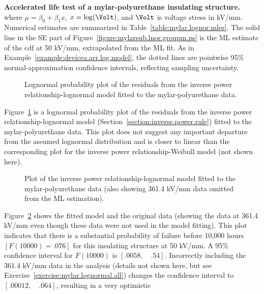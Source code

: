 \begin{example}{\bf Accelerated life test of a mylar-polyurethane insulating 
structure.}
\begin{displaymath}
\end{displaymath}
where $\mu = \beta_{0}+ \beta_{1} x$, $x=\log(\text{\Volt})$, and
$\Volt$ is voltage stress in kV/mm. Numerical estimates are
summarized in Table~\ref{table:mylar.lognor.mles}.  The solid line
in the SE part of Figure~\ref{figure:mylarsub.lnor.groupm.ps} is the
ML estimate of the cdf at 50 kV/mm, extrapolated from the ML fit. As
in Example~\ref{example:devicea.arr.log.model}, the dotted lines are
pointwise 95\% normal-approximation confidence intervals, reflecting
sampling uncertainty.
\begin{figure}
\caption{Lognormal
probability plot of the residuals from the inverse power
relationship-lognormal model fitted to the mylar-polyurethane data.}
\label{figure:mylarsub.residual.linear.lnor.ps}
\end{figure}
Figure~\ref{figure:mylarsub.residual.linear.lnor.ps} is a lognormal
probability plot of the residuals from the inverse power
relationship-lognormal model (Section~\ref{section:inverse.power.rule})
fitted to the mylar-polyurethane data. This plot does not
suggest any important departure from the assumed lognormal
distribution and is closer to linear than the corresponding plot for
the inverse power relationship-Weibull model (not shown here).
\begin{figure}
\caption{Plot of the inverse power relationship-lognormal model fitted to the
mylar-polyurethane data (also showing 361.4 kV/mm
data omitted from the ML estimation).}
\label{figure:mylarpoly.lnor.altplot.ps}
\end{figure}
Figure~\ref{figure:mylarpoly.lnor.altplot.ps} shows the fitted model
and the original data (showing the data at 361.4 kV/mm even though
these data were not used in the model fitting). This plot indicates
that there is a substantial probability of failure before 10,000
hours $[F(10000)=.076]$ for this insulating structure at 50 kV/mm. A
95\% confidence interval for $F(10000)$ is $[.0058, \quad
.54]$. Incorrectly including the 361.4 kV/mm data in the analysis
(details not shown here, but see
Exercise~\ref{exercise:mylar.lognormal.all}) changes the confidence
interval to $[.00012, \quad .064]$, resulting in a very optimistic

\end{example}
